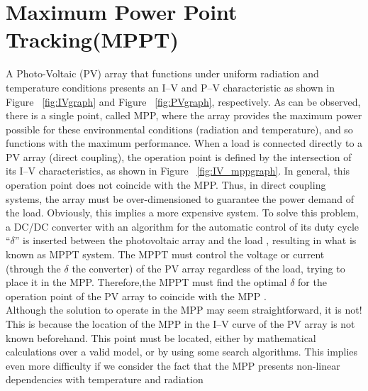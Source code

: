    
\section{Maximum Power Point Tracking(MPPT)}

A Photo-Voltaic (PV) array that functions under uniform radiation and temperature conditions presents an I–V and P–V characteristic as shown in Figure ~\ref{fig:IVgraph} and Figure ~\ref{fig:PVgraph}, respectively. As can be observed, there is a single point, called \ac{MPP}, where the array provides the maximum power possible for these environmental conditions (radiation and temperature), and so functions with the maximum performance. When a load is connected directly to a PV array (direct coupling), the operation point is defined by the intersection of its I–V characteristics, as shown in Figure ~\ref{fig:IV_mppgraph}. In general, this operation point does not coincide with the \ac{MPP}. Thus, in direct coupling systems, the array must be over-dimensioned to guarantee the power demand of the load. Obviously, this implies a more expensive system. To solve this problem, a DC/DC  converter with an algorithm for the automatic control of its duty cycle “${\delta}$” is inserted between the photovoltaic array and the load , resulting in what is known as \ac{MPPT} system. The \ac{MPPT} must control the voltage or current (through the ${\delta}$ the converter) of the PV array regardless of the load, trying to place it in the \ac{MPP}. Therefore,the \ac{MPPT} must find the optimal ${\delta}$ for the operation point of the PV array to coincide with the \ac{MPP} \cite{enrique2010reliable}.\\

Although the solution to operate in the \ac{MPP} may seem straightforward, it is not! This is because the location of the \ac{MPP} in the I–V curve of the PV array is not known beforehand. This point must be located, either by mathematical calculations over a valid model, or by using some search algorithms. This implies even more difficulty if we consider the fact that the \ac{MPP} presents non-linear dependencies with temperature and radiation\cite{enrique2010reliable}\\

